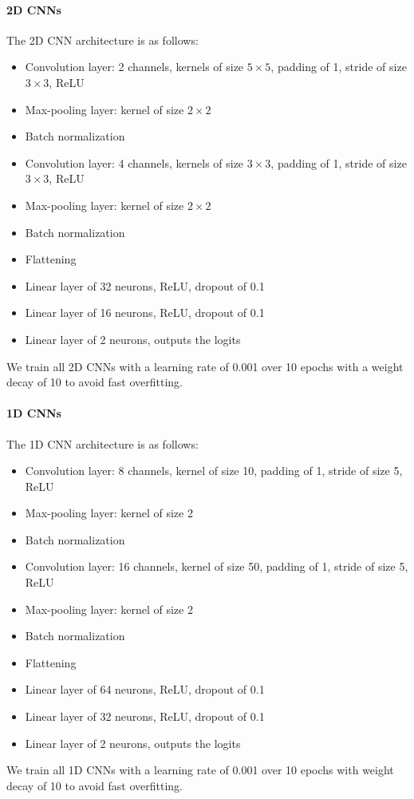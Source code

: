 \documentclass[10pt,conference,compsocconf]{IEEEtran}
\begin{document}
\paragraph{2D CNNs}
The 2D CNN architecture is as follows:
\begin{itemize}
  \item Convolution layer: 2 channels, kernels of size \(5\times 5\), padding of 1, stride of size \(3\times 3\), ReLU
  \item Max-pooling layer: kernel of size \(2\times 2\)
  \item Batch normalization
  \item Convolution layer: 4 channels, kernels of size \(3\times 3\), padding of 1, stride of size \(3\times 3\), ReLU
  \item Max-pooling layer: kernel of size \(2\times 2\)
  \item Batch normalization
  \item Flattening
  \item Linear layer of 32 neurons, ReLU, dropout of 0.1
  \item Linear layer of 16 neurons, ReLU, dropout of 0.1
  \item Linear layer of 2 neurons, outputs the logits
\end{itemize}
We train all 2D CNNs with a learning rate of 0.001 over 10 epochs with a weight decay of 10 to avoid fast overfitting.

\paragraph{1D CNNs}
The 1D CNN architecture is as follows:
\begin{itemize}
  \item Convolution layer: 8 channels, kernel of size 10, padding of 1, stride of size 5, ReLU
  \item Max-pooling layer: kernel of size 2
  \item Batch normalization
  \item Convolution layer: 16 channels, kernel of size 50, padding of 1, stride of size 5, ReLU
  \item Max-pooling layer: kernel of size 2
  \item Batch normalization
  \item Flattening
  \item Linear layer of 64 neurons, ReLU, dropout of 0.1
  \item Linear layer of 32 neurons, ReLU, dropout of 0.1
  \item Linear layer of 2 neurons, outputs the logits
\end{itemize}
We train all 1D CNNs with a learning rate of 0.001 over 10 epochs with weight decay of 10 to avoid fast overfitting.

\clearpage



\end{document}
